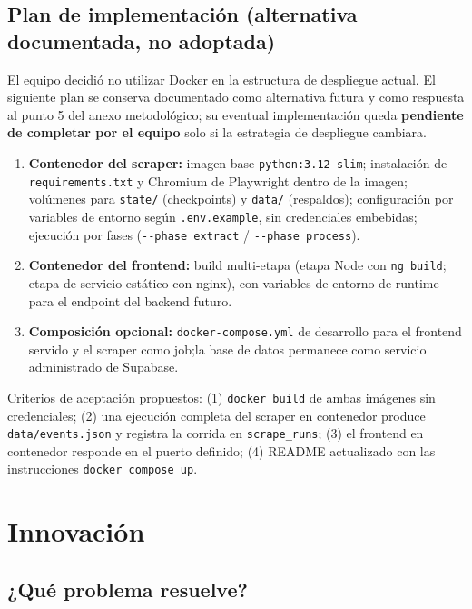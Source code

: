 \subsection{Plan de implementación (alternativa documentada, no adoptada)}

El equipo decidió no utilizar Docker en la estructura de despliegue actual. El siguiente plan
se conserva documentado como alternativa futura y como respuesta al punto 5 del anexo
metodológico; su eventual implementación queda
\textcolor{rojo}{\textbf{pendiente de completar por el equipo}} solo si la estrategia de
despliegue cambiara.

\begin{enumerate}[leftmargin=1.6em]
    \item \textbf{Contenedor del scraper:} imagen base \texttt{python:3.12-slim};
    instalación de \texttt{requirements.txt} y Chromium de Playwright dentro de la imagen;
    volúmenes para \texttt{state/} (checkpoints) y \texttt{data/} (respaldos);
    configuración por variables de entorno según \texttt{.env.example}, sin credenciales
    embebidas; ejecución por fases (\texttt{-{}-phase extract} / \texttt{-{}-phase process}).
    \item \textbf{Contenedor del frontend:} build multi-etapa (etapa Node con \texttt{ng build};
    etapa de servicio estático con nginx), con variables de entorno de runtime para el
    endpoint del backend futuro.
    \item \textbf{Composición opcional:} \texttt{docker-compose.yml} de desarrollo para el
    frontend servido y el scraper como job;la base de datos permanece como
    servicio administrado de Supabase.
\end{enumerate}

Criterios de aceptación propuestos: (1) \texttt{docker build} de ambas imágenes sin
credenciales; (2) una ejecución completa del scraper en contenedor produce
\texttt{data/events.json} y registra la corrida en \texttt{scrape\_runs}; (3) el frontend en
contenedor responde en el puerto definido; (4) README actualizado con las instrucciones
\texttt{docker compose up}.

\section{Innovación}
\label{sec:innovacion}

\subsection{¿Qué problema resuelve?}

